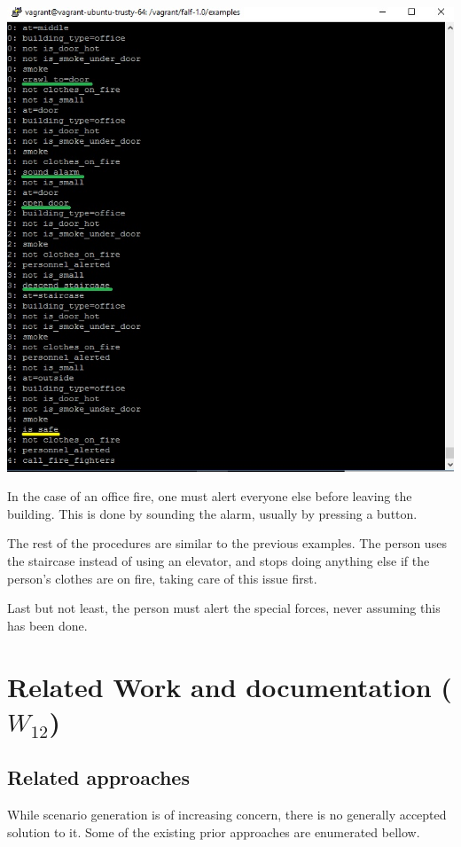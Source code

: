 \documentclass[a4paper,12pt]{report}
\begin{document}
\includegraphics[scale=0.8]{Screenshot_office_fire.jpg}

In the case of an office fire, one must alert everyone else before leaving the building.
This is done by sounding the alarm, usually by pressing a button.

The rest of the procedures are similar to the previous examples.
The person uses the staircase instead of using an elevator, and stops doing anything else if the person's clothes are on fire, taking care of this issue first.

Last but not least, the person must alert the special forces, never assuming this has been done.



\chapter{Related Work and documentation ($W_{12}$)}

\section{Related approaches}

While scenario generation is of increasing concern, there is no generally accepted solution to it. Some of the existing prior approaches are enumerated bellow.
\end{document}
